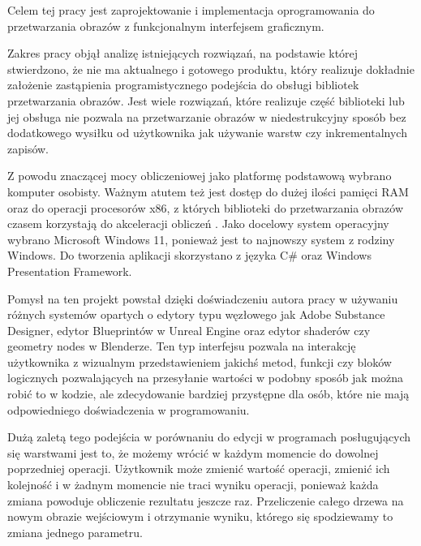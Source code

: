 Celem tej pracy jest zaprojektowanie i implementacja oprogramowania do przetwarzania obrazów z funkcjonalnym interfejsem graficznym.

Zakres pracy objął analizę istniejących rozwiązań, na podstawie której stwierdzono, że nie ma aktualnego i gotowego produktu, który realizuje dokładnie założenie zastąpienia programistycznego podejścia do obsługi bibliotek przetwarzania obrazów. 
Jest wiele rozwiązań, które realizuje część biblioteki lub jej obsługa nie pozwala na przetwarzanie obrazów w niedestrukcyjny sposób bez dodatkowego wysiłku od użytkownika jak używanie warstw czy inkrementalnych zapisów. 

Z powodu znaczącej mocy obliczeniowej jako platformę podstawową wybrano komputer osobisty. Ważnym atutem też jest dostęp do dużej ilości pamięci RAM oraz do operacji procesorów x86, z których biblioteki do przetwarzania obrazów czasem korzystają do akceleracji obliczeń \cite{x86opencv}. 
Jako docelowy system operacyjny wybrano Microsoft Windows 11, ponieważ jest to najnowszy system z rodziny Windows. 
Do tworzenia aplikacji skorzystano z języka C\# oraz Windows Presentation Framework. 

Pomysł na ten projekt powstał dzięki doświadczeniu autora pracy w używaniu różnych systemów opartych o edytory typu węzłowego jak Adobe Substance Designer, edytor Blueprintów w Unreal Engine oraz edytor shaderów czy geometry nodes w Blenderze. 
Ten typ interfejsu pozwala na interakcję użytkownika z wizualnym przedstawieniem jakichś metod, funkcji czy bloków logicznych pozwalających na przesyłanie wartości w podobny sposób jak można robić to w kodzie, ale zdecydowanie bardziej przystępne dla osób, które nie mają odpowiedniego doświadczenia w programowaniu.

Dużą zaletą tego podejścia w porównaniu do edycji w programach posługujących się warstwami jest to, że możemy wrócić w każdym momencie do dowolnej poprzedniej operacji. 
Użytkownik może zmienić wartość operacji, zmienić ich kolejność i w żadnym momencie nie traci wyniku operacji, ponieważ każda zmiana powoduje obliczenie rezultatu jeszcze raz. 
Przeliczenie całego drzewa na nowym obrazie wejściowym i otrzymanie wyniku, którego się spodziewamy to zmiana jednego parametru.